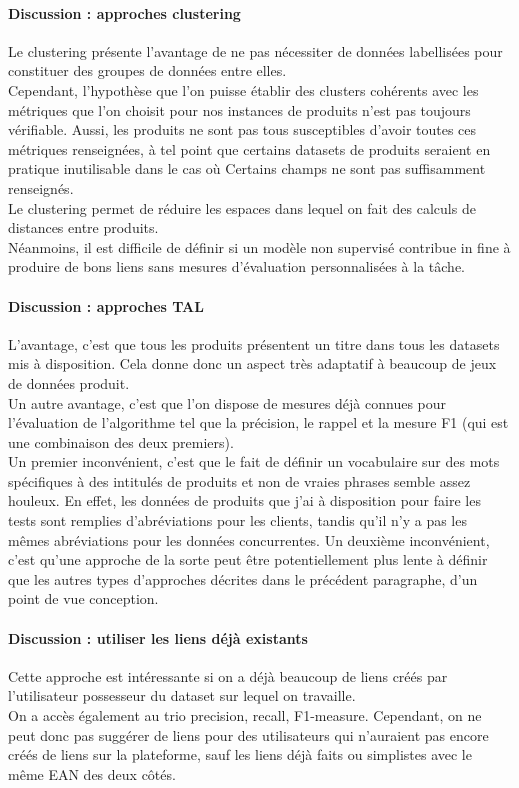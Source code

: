 \documentclass{rapportCS}
\begin{document}
\paragraph{Discussion : approches clustering}
Le clustering présente l'avantage de ne pas nécessiter de données labellisées pour constituer des groupes
de données entre elles.\\
Cependant, l'hypothèse que l'on puisse établir des clusters cohérents
avec les métriques que l'on choisit pour nos instances de produits n'est pas toujours vérifiable.
Aussi, les produits ne sont pas tous susceptibles d'avoir toutes ces métriques renseignées,
à tel point que certains datasets de produits seraient en pratique inutilisable dans le cas où Certains
champs ne sont pas suffisamment renseignés.\\
Le clustering permet de réduire les espaces dans lequel on fait des calculs de distances entre produits.\\
Néanmoins, il est difficile de définir si un modèle non supervisé contribue in fine à produire de bons liens sans mesures
d'évaluation personnalisées à la tâche.

\paragraph{Discussion : approches TAL}
L'avantage, c'est que tous les produits présentent un titre dans tous les datasets mis à disposition. Cela
donne donc un aspect très adaptatif à beaucoup de jeux de données produit.
\cite{peeters_supervised_2022-1,product_matching_ecommerce}\\
Un autre avantage, c'est que l'on dispose de mesures déjà connues pour l'évaluation de l'algorithme tel que
la précision, le rappel et la mesure F1 (qui est une combinaison des deux premiers).\\
Un premier inconvénient, c'est que le fait de définir un vocabulaire sur des mots spécifiques à des intitulés de produits 
et non de vraies phrases semble assez houleux. En effet, les données de produits que j'ai à disposition pour faire les
tests sont remplies d'abréviations pour les clients, tandis qu'il n'y a pas les mêmes 
abréviations pour les données concurrentes.
Un deuxième inconvénient, c'est qu'une approche de la sorte peut être potentiellement plus lente à définir que 
les autres types d'approches décrites dans le précédent paragraphe, d'un point de vue conception.


\paragraph{Discussion : utiliser les liens déjà existants}
Cette approche est intéressante si on a déjà beaucoup de liens créés par l'utilisateur possesseur du dataset sur
lequel on travaille.\\
On a accès également au trio precision, recall, F1-measure.
Cependant, on ne peut donc pas suggérer de liens pour des utilisateurs qui n'auraient pas
encore créés de liens sur la plateforme, sauf les liens déjà faits ou simplistes avec le même EAN des deux
côtés.
\end{document}
